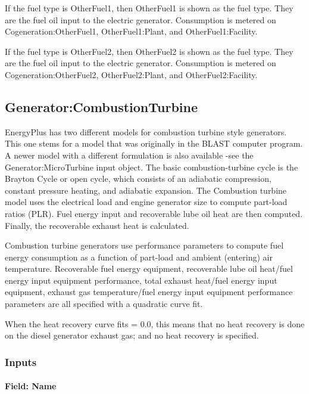 If the fuel type is OtherFuel1, then OtherFuel1 is shown as the fuel type. They are the fuel oil input to the electric generator. Consumption is metered on Cogeneration:OtherFuel1, OtherFuel1:Plant, and OtherFuel1:Facility.

If the fuel type is OtherFuel2, then OtherFuel2 is shown as the fuel type. They are the fuel oil input to the electric generator. Consumption is metered on Cogeneration:OtherFuel2, OtherFuel2:Plant, and OtherFuel2:Facility.

\subsection{Generator:CombustionTurbine}\label{generatorcombustionturbine}

EnergyPlus has two different models for combustion turbine style generators. This one stems for a model that was originally in the BLAST computer program. A newer model with a different formulation is also available -see the Generator:MicroTurbine input object. The basic combustion-turbine cycle is the Brayton Cycle or open cycle, which consists of an adiabatic compression, constant pressure heating, and adiabatic expansion. The Combustion turbine model uses the electrical load and engine generator size to compute part-load ratios (PLR). Fuel energy input and recoverable lube oil heat are then computed. Finally, the recoverable exhaust heat is calculated.

Combustion turbine generators use performance parameters to compute fuel energy consumption as a function of part-load and ambient (entering) air temperature. Recoverable fuel energy equipment, recoverable lube oil heat/fuel energy input equipment performance, total exhaust heat/fuel energy input equipment, exhaust gas temperature/fuel energy input equipment performance parameters are all specified with a quadratic curve fit.

When the heat recovery curve fits = 0.0, this means that no heat recovery is done on the diesel generator exhaust gas; and no heat recovery is specified.

\subsubsection{Inputs}\label{inputs-8-005}

\paragraph{Field: Name}\label{field-name-9-004}

